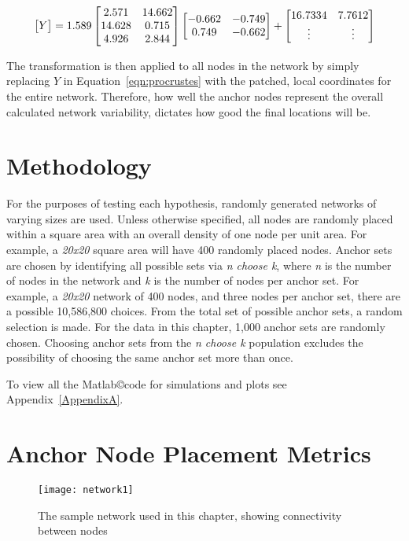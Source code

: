 \begin{equation}\label{eqn:sampleProcrustes1}
\begin{bmatrix}$$Y$$\end{bmatrix}=1.589\begin{bmatrix}
	2.571   & 14.662 \\
   14.628   &  0.715 \\
    4.926   &  2.844\end{bmatrix}\begin{bmatrix}
	-0.662  & -0.749 \\
    0.749   & -0.662\end{bmatrix}+\begin{bmatrix}
16.7334 & 7.7612 \\
\vdots & \vdots$$\end{bmatrix}
\end{equation}

The transformation is then applied to all nodes in the network by simply replacing $Y$ in Equation~\ref{eqn:procrustes} with the patched, local coordinates for the entire network. Therefore, how well the anchor nodes represent the overall calculated network variability, dictates how good the final locations will be.

\section{Methodology}
For the purposes of testing each hypothesis, randomly generated networks of varying sizes are used.  Unless otherwise specified, all nodes are randomly placed within a square area with an overall density of one node per unit area.  For example, a \emph{20x20} square area will have 400 randomly placed nodes.  Anchor sets are chosen by identifying all possible sets via \emph{n choose k}, where \emph{n} is the number of nodes in the network and \emph{k} is the number of nodes per anchor set.  For example, a \emph{20x20} network of 400 nodes, and three nodes per anchor set, there are a possible 10,586,800 choices.  From the total set of possible anchor sets, a random selection is made.  For the data in this chapter, 1,000 anchor sets are randomly chosen.  Choosing anchor sets from the \emph{n choose k} population excludes the possibility of choosing the same anchor set more than once.

To view all the Matlab\copyright code for simulations and plots see Appendix~\ref{AppendixA}.

\section{Anchor Node Placement Metrics}
\begin{figure}
	\centering
		\texttt{[image: network1]}
	\caption[The sample network used in this chapter]{The sample network used in this chapter, showing connectivity between nodes}
	\label{fig:HypothesesNetwork}
\end{figure}


